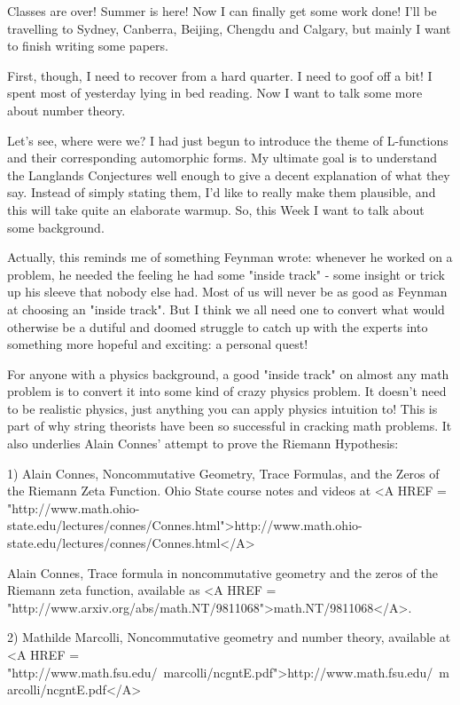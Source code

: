



Classes are over!  Summer is here!  Now I can finally get some work done!
I'll be travelling to Sydney, Canberra, Beijing, Chengdu and Calgary, but 
mainly I want to finish writing some papers.

First, though, I need to recover from a hard quarter.  I need to goof off a 
bit!  I spent most of yesterday lying in bed reading.  Now I want to talk 
some more about number theory.

Let's see, where were we?   I had just begun to introduce the theme of 
L-functions and their corresponding automorphic forms.   My ultimate goal
is to understand the Langlands Conjectures well enough to give a decent 
explanation of what they say.  Instead of simply stating them, I'd like
to really make them plausible, and this will take quite an elaborate warmup.
So, this Week I want to talk about some background.


Actually, this reminds me of something Feynman wrote: whenever he
worked on a problem, he needed the feeling he had some "inside
track" - some insight or trick up his sleeve that nobody else
had.  Most of us will never be as good as Feynman at choosing an
"inside track".  But I think we all need one to convert what
would otherwise be a dutiful and doomed struggle to catch up with the
experts into something more hopeful and exciting: a personal quest!

For anyone with a physics background, a good "inside track" on 
almost any math problem is to convert it into some kind of crazy physics 
problem.  It doesn't 
need to be realistic physics, just anything you can apply physics intuition 
to!  This is part of why string theorists have been so successful in cracking 
math problems.  It also underlies Alain Connes' attempt to prove the Riemann
Hypothesis:

1) Alain Connes, Noncommutative Geometry, Trace Formulas, and the
Zeros of the Riemann Zeta Function.  Ohio State course notes and
videos at
<A HREF = "http://www.math.ohio-state.edu/lectures/connes/Connes.html">http://www.math.ohio-state.edu/lectures/connes/Connes.html</A>

Alain Connes, Trace formula in noncommutative geometry and the zeros of
the Riemann zeta function, available as 
<A HREF = "http://www.arxiv.org/abs/math.NT/9811068">math.NT/9811068</A>.

2) Mathilde Marcolli, Noncommutative geometry and number theory,
available at 
<A HREF = "http://www.math.fsu.edu/~marcolli/ncgntE.pdf">http://www.math.fsu.edu/~marcolli/ncgntE.pdf</A>

